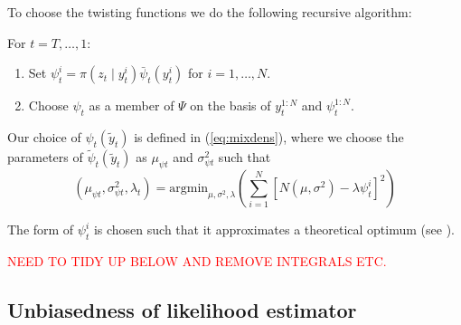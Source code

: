 \documentclass[a4paper]{article}
\begin{document}
To choose the twisting functions we do the following recursive algorithm:

For $t = T, \dots, 1$:
\begin{enumerate}
    \item Set $\psi^i_t = \pi\left(z_t \mid y^i_t\right) \bar{\psi}_t\left(y^i_t\right)$ for $i = 1,\dots, N$.
    \item Choose $\psi_t$ as a member of $\Psi$ on the basis of $y^{1:N}_t$ and $\psi^{1:N}_t$.
\end{enumerate}

Our choice of $\psi_t\left(\tilde{y}_t\right)$ is defined in (\ref{eq:mixdens}), where we choose the parameters of $\tilde{\psi}_t\left(\tilde{y}_t\right)$ as $\mu_{\psi t}$ and $\sigma^2_{\psi t}$ such that
\begin{equation}
    \left(\mu_{\psi t}, \sigma^2_{\psi t}, \lambda_t \right) = \mbox{argmin}_{\mu, \sigma^2, \lambda} \left(\sum_{i = 1}^N \left[N\left(\mu, \sigma^2\right) - \lambda\psi^i_t\right]^2\right)
\end{equation}

The form of $\psi^i_t$ is chosen such that it approximates a theoretical optimum (see \citealp{guarnieroetal:2017}).

\textcolor{red}{NEED TO TIDY UP BELOW AND REMOVE INTEGRALS ETC.}

\subsection{Unbiasedness of likelihood estimator}
\end{document}

